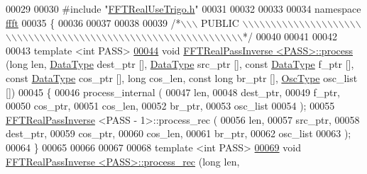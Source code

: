 \begin{DoxyCode}
00029 
00030 \textcolor{preprocessor}{#include    "\hyperlink{a00106}{FFTRealUseTrigo.h}"}
00031 
00032 
00033 
00034 \textcolor{keyword}{namespace }\hyperlink{a00142}{ffft}
00035 \{
00036 
00037 
00038 
00039 \textcolor{comment}{/*\(\backslash\)\(\backslash\)\(\backslash\) PUBLIC \(\backslash\)\(\backslash\)\(\backslash\)\(\backslash\)\(\backslash\)\(\backslash\)\(\backslash\)\(\backslash\)\(\backslash\)\(\backslash\)\(\backslash\)\(\backslash\)\(\backslash\)\(\backslash\)\(\backslash\)\(\backslash\)\(\backslash\)\(\backslash\)\(\backslash\)\(\backslash\)\(\backslash\)\(\backslash\)\(\backslash\)\(\backslash\)\(\backslash\)\(\backslash\)\(\backslash\)\(\backslash\)\(\backslash\)\(\backslash\)\(\backslash\)\(\backslash\)\(\backslash\)\(\backslash\)\(\backslash\)\(\backslash\)\(\backslash\)\(\backslash\)\(\backslash\)\(\backslash\)\(\backslash\)\(\backslash\)\(\backslash\)\(\backslash\)\(\backslash\)\(\backslash\)\(\backslash\)\(\backslash\)\(\backslash\)\(\backslash\)\(\backslash\)\(\backslash\)\(\backslash\)\(\backslash\)\(\backslash\)\(\backslash\)\(\backslash\)\(\backslash\)\(\backslash\)\(\backslash\)\(\backslash\)\(\backslash\)\(\backslash\)*/}
00040 
00041 
00042 
00043 \textcolor{keyword}{template} <\textcolor{keywordtype}{int} PASS>
\hypertarget{a00103_source_l00044}{}\hyperlink{a00014_a70cd43ea5def2c3f79c4a0b03348261e}{00044} \textcolor{keywordtype}{void}    \hyperlink{a00014}{FFTRealPassInverse <PASS>::process} (\textcolor{keywordtype}{long} len, 
      \hyperlink{a00014_adecc3668f71245ef20a93546a55b3190}{DataType} dest\_ptr [], \hyperlink{a00014_adecc3668f71245ef20a93546a55b3190}{DataType} src\_ptr [], \textcolor{keyword}{const} \hyperlink{a00014_adecc3668f71245ef20a93546a55b3190}{DataType} f\_ptr [], \textcolor{keyword}{const} 
      \hyperlink{a00014_adecc3668f71245ef20a93546a55b3190}{DataType} cos\_ptr [], \textcolor{keywordtype}{long} cos\_len, \textcolor{keyword}{const} \textcolor{keywordtype}{long} br\_ptr [], \hyperlink{a00020}{OscType} osc\_list [])
00045 \{
00046     process\_internal (
00047         len,
00048         dest\_ptr,
00049         f\_ptr,
00050         cos\_ptr,
00051         cos\_len,
00052         br\_ptr,
00053         osc\_list
00054     );
00055     \hyperlink{a00014}{FFTRealPassInverse} <PASS - 1>::process\_rec (
00056         len,
00057         src\_ptr,
00058         dest\_ptr,
00059         cos\_ptr,
00060         cos\_len,
00061         br\_ptr,
00062         osc\_list
00063     );
00064 \}
00065 
00066 
00067 
00068 \textcolor{keyword}{template} <\textcolor{keywordtype}{int} PASS>
\hypertarget{a00103_source_l00069}{}\hyperlink{a00014_a814ede91583f5710bbd3d89154b310b1}{00069} \textcolor{keywordtype}{void}    \hyperlink{a00014}{FFTRealPassInverse <PASS>::process\_rec} (\textcolor{keywordtype}{long} len, 

\end{DoxyCode}
